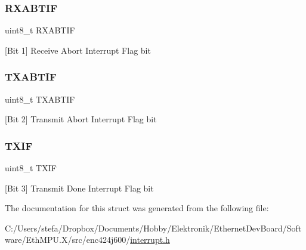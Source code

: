 \mbox{\label{structinterrupt_flags__t_adfd2bd74bfbf9d086ac5364f2c2bc420}} 
\subsubsection{\texorpdfstring{RXABTIF}{RXABTIF}}
{\footnotesize\ttfamily uint8\+\_\+t R\+X\+A\+B\+T\+IF}



\mbox{[}Bit 1\mbox{]} Receive Abort Interrupt Flag bit 

\mbox{\label{structinterrupt_flags__t_aef79dc4f43ab3844327f963cedfc3a57}} 
\subsubsection{\texorpdfstring{TXABTIF}{TXABTIF}}
{\footnotesize\ttfamily uint8\+\_\+t T\+X\+A\+B\+T\+IF}



\mbox{[}Bit 2\mbox{]} Transmit Abort Interrupt Flag bit 

\mbox{\label{structinterrupt_flags__t_a8ac6b64dff7b25ddf36cea5543329e56}} 
\subsubsection{\texorpdfstring{TXIF}{TXIF}}
{\footnotesize\ttfamily uint8\+\_\+t T\+X\+IF}



\mbox{[}Bit 3\mbox{]} Transmit Done Interrupt Flag bit 



The documentation for this struct was generated from the following file\+:\begin{DoxyCompactItemize}
\item 
C\+:/\+Users/stefa/\+Dropbox/\+Documents/\+Hobby/\+Elektronik/\+Ethernet\+Dev\+Board/\+Software/\+Eth\+M\+P\+U.\+X/src/enc424j600/\mbox{\hyperlink{interrupt_8h}{interrupt.\+h}}\end{DoxyCompactItemize}
